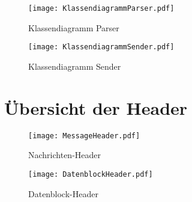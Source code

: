 \begin{figure}[H]
	\centering
	\texttt{[image: KlassendiagrammParser.pdf]}
	\caption{Klassendiagramm Parser}
	\label{fig:KlassendiagrammParser}
\end{figure}

\newpage

\begin{figure}[H]
	\centering
	\texttt{[image: KlassendiagrammSender.pdf]}
	\caption{Klassendiagramm Sender}
	\label{fig:KlassendiagrammSender}
\end{figure}

\section{Übersicht der Header}
\label{sec:HeaderUebersicht}

\begin{figure}[H]
	\centering
	\texttt{[image: MessageHeader.pdf]}
	\caption{Nachrichten-Header}
	\label{fig:NachrichtenHeader}
\end{figure}

\newpage

\begin{figure}[H]
	\centering
	\texttt{[image: DatenblockHeader.pdf]}
	\caption{Datenblock-Header}
	\label{fig:DatenblockHeader}
\end{figure}
